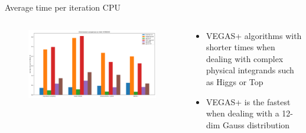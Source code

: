 \documentclass[t,handout,professionalfont,serif]{beamer}
\begin{document}
\begin{frame}{Average time per iteration CPU}
	\tiny
	\begin{columns}
		\begin{column}{0.7 \textwidth}
			\begin{figure}
									\includegraphics[width= \columnwidth]{../tex/images/CPU_final.png}
			\end{figure}

		\end{column}
	\hspace{-0.5cm}
	\begin{column}{0.3\textwidth}
					\vspace{0.7cm}
					
		\begin{itemize}

			\item VEGAS+ algorithms with shorter times when dealing with complex physical integrands such as Higgs or Top
		    \item VEGAS+ is the fastest when dealing with a 12-dim Gauss distribution
	\end{itemize}
	\end{column}
	\end{columns}


\end{frame}
\end{document}
